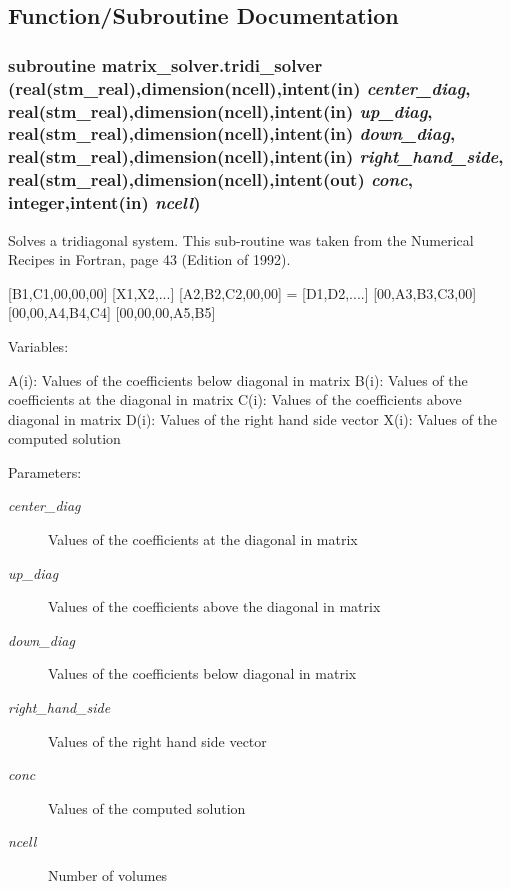 \subsection{Function/Subroutine Documentation}
\hypertarget{a00066_f8a75322afb36d15bb848db092161abd}{
\subsubsection[{tridi\_\-solver}]{\setlength{\rightskip}{0pt plus 5cm}subroutine matrix\_\-solver.tridi\_\-solver (real(stm\_\-real),dimension(ncell),intent(in) {\em center\_\-diag}, \/  real(stm\_\-real),dimension(ncell),intent(in) {\em up\_\-diag}, \/  real(stm\_\-real),dimension(ncell),intent(in) {\em down\_\-diag}, \/  real(stm\_\-real),dimension(ncell),intent(in) {\em right\_\-hand\_\-side}, \/  real(stm\_\-real),dimension(ncell),intent(out) {\em conc}, \/  integer,intent(in) {\em ncell})}}
\label{a00066_f8a75322afb36d15bb848db092161abd}


Solves a tridiagonal system. This sub-routine was taken from the Numerical Recipes in Fortran, page 43 (Edition of 1992). 

\mbox{[}B1,C1,00,00,00\mbox{]} \mbox{[}X1,X2,...\mbox{]} \mbox{[}A2,B2,C2,00,00\mbox{]} = \mbox{[}D1,D2,....\mbox{]} \mbox{[}00,A3,B3,C3,00\mbox{]} \mbox{[}00,00,A4,B4,C4\mbox{]} \mbox{[}00,00,00,A5,B5\mbox{]}

Variables:

A(i): Values of the coefficients below diagonal in matrix B(i): Values of the coefficients at the diagonal in matrix C(i): Values of the coefficients above diagonal in matrix D(i): Values of the right hand side vector X(i): Values of the computed solution \begin{Desc}
\item[Parameters:]
\begin{description}
\item[{\em center\_\-diag}]Values of the coefficients at the diagonal in matrix\item[{\em up\_\-diag}]Values of the coefficients above the diagonal in matrix\item[{\em down\_\-diag}]Values of the coefficients below diagonal in matrix\item[{\em right\_\-hand\_\-side}]Values of the right hand side vector\item[{\em conc}]Values of the computed solution\item[{\em ncell}]Number of volumes \end{description}
\end{Desc}
